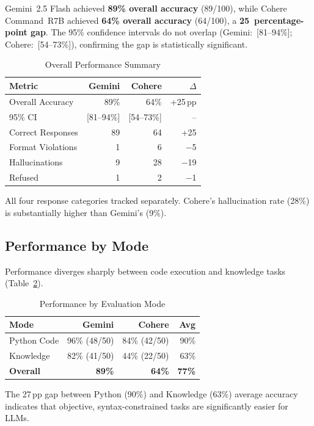 \documentclass[conference]{IEEEtran}
\begin{document}
Gemini~2.5 Flash achieved \textbf{89\% overall accuracy} (89/100), while Cohere Command~R7B achieved \textbf{64\% overall accuracy} (64/100), a \textbf{25~percentage-point gap}. The 95\% confidence intervals do not overlap (Gemini:~[81--94\%]; Cohere:~[54--73\%]), confirming the gap is statistically significant.

\begin{table}[!t]
\caption{Overall Performance Summary}
\label{tab:overall}
\centering
\begin{tabular}{l r r r}
\toprule
\textbf{Metric} & \textbf{Gemini} & \textbf{Cohere} & \textbf{$\Delta$} \\
\midrule
Overall Accuracy       & 89\% & 64\% & +25\,pp \\
95\% CI                & [81--94\%] & [54--73\%] & -- \\
Correct Responses      & 89  & 64  & +25 \\
Format Violations      & 1   & 6   & $-$5 \\
Hallucinations         & 9   & 28  & $-$19 \\
Refused                & 1   & 2   & $-$1 \\
\bottomrule
\end{tabular}
\vspace{2pt}
\footnotesize All four response categories tracked separately. Cohere's hallucination rate (28\%) is substantially higher than Gemini's (9\%).
\end{table}

\subsection{Performance by Mode}

Performance diverges sharply between code execution and knowledge tasks (Table~\ref{tab:mode}).

\begin{table}[!t]
\caption{Performance by Evaluation Mode}
\label{tab:mode}
\centering
\begin{tabular}{l r r r}
\toprule
\textbf{Mode} & \textbf{Gemini} & \textbf{Cohere} & \textbf{Avg} \\
\midrule
Python Code    & 96\% (48/50) & 84\% (42/50) & 90\% \\
Knowledge      & 82\% (41/50) & 44\% (22/50) & 63\% \\
\midrule
\textbf{Overall} & \textbf{89\%} & \textbf{64\%} & \textbf{77\%} \\
\bottomrule
\end{tabular}
\vspace{2pt}
\footnotesize The 27\,pp gap between Python (90\%) and Knowledge (63\%) average accuracy indicates that objective, syntax-constrained tasks are significantly easier for LLMs.
\end{table}
\end{document}
